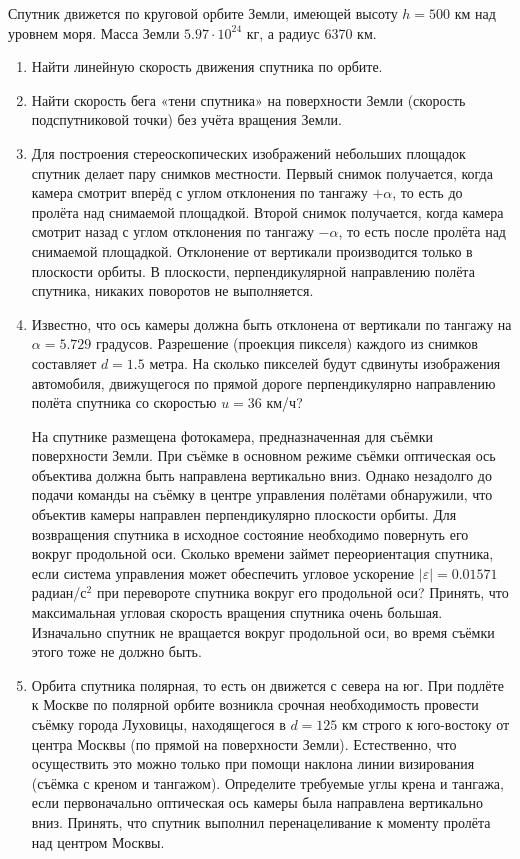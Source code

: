 
Спутник движется по круговой орбите Земли, имеющей высоту $h=500$ км над уровнем моря. Масса Земли $5.97 \cdot 10^{24}$ кг,
а радиус 6370 км.

\begin{enumerate}
    \item Найти линейную скорость движения спутника по орбите.
    \item Найти скорость бега «тени спутника» на поверхности Земли (скорость подспутниковой точки) без учёта 
    вращения Земли.
    \item Для построения стереоскопических изображений небольших площадок спутник делает пару снимков местности. 
    Первый снимок получается, когда камера смотрит вперёд с углом отклонения по тангажу $+\alpha$, то есть до пролёта 
    над снимаемой площадкой. Второй снимок получается, когда камера смотрит назад с углом отклонения по тангажу 
    $-\alpha$, то есть  после пролёта над снимаемой площадкой. Отклонение от вертикали производится только в 
    плоскости орбиты. В плоскости, перпендикулярной направлению полёта спутника, никаких поворотов не выполняется.
    \item Известно, что ось камеры должна быть отклонена от вертикали по тангажу на $\alpha=5.729$ градусов. 
    Разрешение (проекция пикселя) каждого из снимков составляет $d=1.5$ метра. На сколько пикселей будут сдвинуты 
    изображения автомобиля, движущегося по прямой дороге перпендикулярно направлению полёта спутника со скоростью 
    $u=36$ км/ч?

    На спутнике размещена фотокамера, предназначенная для съёмки поверхности Земли. При съёмке в основном режиме 
    съёмки оптическая ось объектива должна быть направлена вертикально вниз. Однако незадолго до подачи команды 
    на съёмку в центре управления полётами обнаружили, что объектив камеры направлен перпендикулярно плоскости 
    орбиты. Для возвращения спутника в исходное состояние необходимо повернуть его вокруг продольной оси. 
    Сколько времени займет переориентация спутника, если система управления может обеспечить угловое ускорение 
    $|\varepsilon|=0.01571$ радиан/с$^2$ при перевороте спутника вокруг его продольной оси? Принять, что максимальная 
    угловая скорость вращения спутника очень большая. Изначально спутник не вращается вокруг продольной оси, 
    во время съёмки этого тоже не должно быть.
    \item Орбита спутника полярная, то есть он движется с севера на юг. При подлёте к Москве по полярной 
    орбите возникла срочная необходимость провести съёмку города Луховицы, находящегося в $d=125$ км строго к 
    юго-востоку от центра Москвы (по прямой на поверхности Земли). Естественно, что осуществить это можно только 
    при помощи наклона линии визирования (съёмка с креном и тангажом). Определите требуемые углы крена и тангажа, 
    если первоначально оптическая ось камеры была направлена вертикально вниз. Принять, что спутник выполнил 
    перенацеливание к моменту пролёта над центром Москвы.


\end{enumerate}
